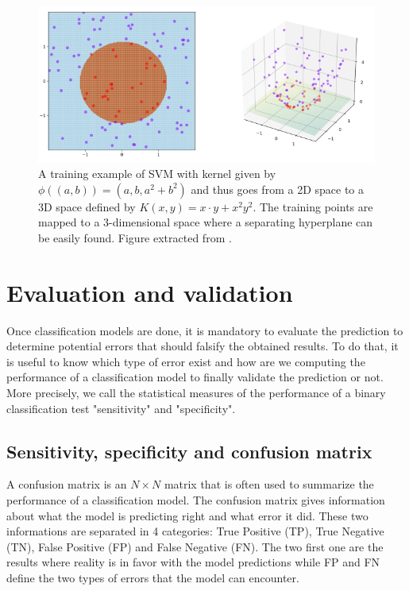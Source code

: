 \documentclass[11pt, openany]{report}
\theoremstyle{plain}
\theoremstyle{definition}
\theoremstyle{remark}
\begin{document}
\begin{figure}[h]
  \centering
  \includegraphics[scale=0.65]{figures/kernel-trick.png}
  \caption{A training example of SVM with kernel given by $\phi((a, b)) = (a, b, a^{2} + b^{2})$ and thus goes from a 2D space to a 3D space defined by $K(x, y) = x \cdot y + x^2 y^2$. The training points are mapped to a 3-dimensional space where a separating hyperplane can be easily found. Figure extracted from \cite{wiki-svm}.}
  \label{fig:kernel-trick}
\end{figure}

\newpage
\section{Evaluation and validation} \label{sec:evaluation}
 
Once classification models are done, it is mandatory to evaluate the prediction to determine potential errors that should falsify the obtained results.  To do that, it is useful to know which type of error exist and how are we computing the performance of a classification model to finally validate the prediction or not. More precisely, we call the statistical measures of the performance of a binary classification test "sensitivity" and "specificity". 

\subsection{Sensitivity, specificity and confusion matrix}
A confusion matrix is an $N \times N$ matrix that is often used to summarize the performance of a classification model. The confusion matrix gives information about what the model is predicting right and what error it did. These two informations are separated in 4 categories: True Positive (TP), True Negative (TN), False Positive (FP) and False Negative (FN). The two first one are the results where reality is in favor with the model predictions while FP and FN define the two types of errors that the model can encounter.
\end{document}
